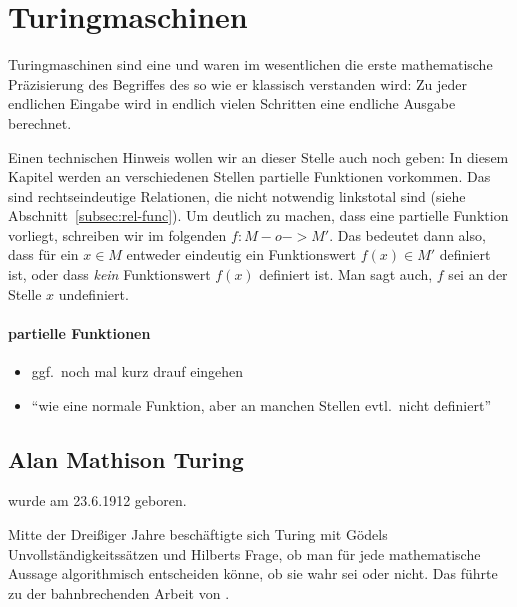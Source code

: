 \Tut\chapter{Turingmaschinen}
\label{k:turingmaschinen}

Turingmaschinen sind eine und waren im wesentlichen die erste
mathematische Präzisierung des Begriffes des
 so wie er klassisch
verstanden wird:
%
Zu jeder endlichen Eingabe wird in endlich vielen Schritten eine
endliche Ausgabe berechnet.

Einen technischen Hinweis wollen wir an dieser Stelle auch noch geben:
In diesem Kapitel werden an verschiedenen Stellen partielle Funktionen
vorkommen. 
%
Das sind rechtseindeutige Relationen, die nicht notwendig linkstotal
sind (siehe Abschnitt~\ref{subsec:rel-func}). 
%
Um deutlich zu machen, dass eine partielle Funktion vorliegt,
schreiben wir im folgenden $f: M -o-> M'$. 
%
Das bedeutet dann also, dass für ein $x\in M$ entweder eindeutig ein
Funktionswert $f(x)\in M'$ definiert ist, oder dass \emph{kein}
Funktionswert $f(x)$ definiert ist. 
%
Man sagt auch, $f$ sei an der Stelle $x$ undefiniert.

\begin{tutorium}
  \subsubsection*{partielle Funktionen}
  \begin{itemize}
  \item ggf.\ noch mal kurz drauf eingehen
  \item "`wie eine normale Funktion, aber an manchen Stellen evtl.\ nicht definiert"'
  \end{itemize}
\end{tutorium}

\Tut\section{Alan Mathison Turing}
\label{sec:turing}

 wurde am
23.6.1912 geboren.

Mitte der Dreißiger Jahre beschäftigte sich Turing mit Gödels
Unvollständigkeitssätzen und Hilberts Frage, ob man für jede
mathematische Aussage algorithmisch entscheiden könne, ob sie wahr sei
oder nicht.  
%
Das führte zu der bahnbrechenden Arbeit
\emph{} von
\citeyear{Turing_1936_CNW_ar}.

